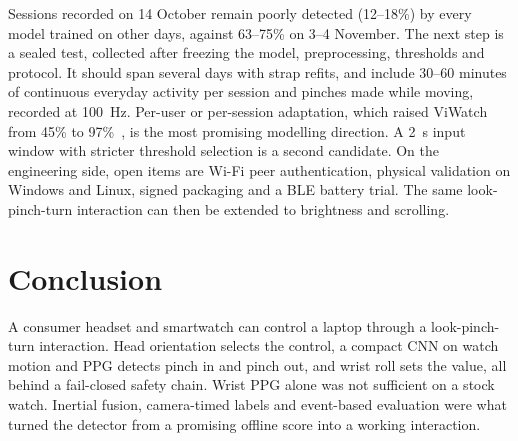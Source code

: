 Sessions recorded on 14 October remain poorly detected (12--18\%) by every model trained on other days, against 63--75\% on 3--4 November. The next step is a sealed test, collected after freezing the model, preprocessing, thresholds and protocol. It should span several days with strap refits, and include 30--60 minutes of continuous everyday activity per session and pinches made while moving, recorded at 100~Hz. Per-user or per-session adaptation, which raised ViWatch from 45\% to 97\%~\cite{viwatch2023}, is the most promising modelling direction. A 2~s input window with stricter threshold selection is a second candidate. On the engineering side, open items are Wi-Fi peer authentication, physical validation on Windows and Linux, signed packaging and a BLE battery trial. The same look-pinch-turn interaction can then be extended to brightness and scrolling.

\section{Conclusion}\label{sec:conclusion}

A consumer headset and smartwatch can control a laptop through a look-pinch-turn interaction. Head orientation selects the control, a compact CNN on watch motion and PPG detects pinch in and pinch out, and wrist roll sets the value, all behind a fail-closed safety chain. Wrist PPG alone was not sufficient on a stock watch. Inertial fusion, camera-timed labels and event-based evaluation were what turned the detector from a promising offline score into a working interaction.
